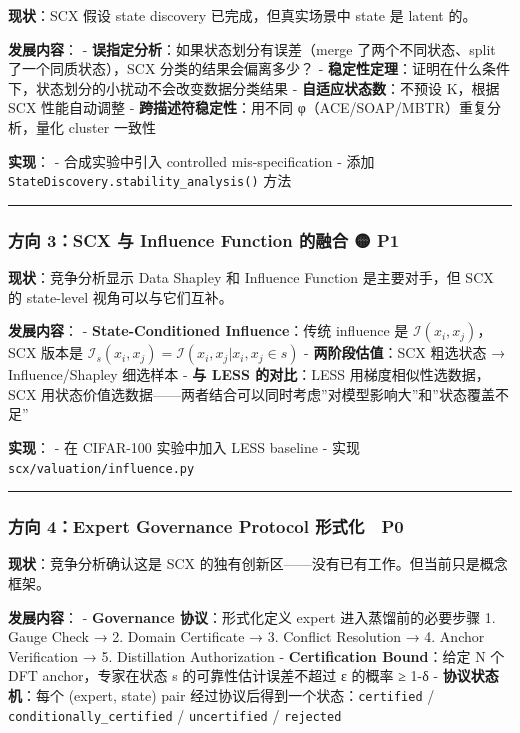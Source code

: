 \documentclass[
  12pt,
]{ctexart}
\begin{document}
\textbf{现状}：SCX 假设 state discovery 已完成，但真实场景中 state 是
latent 的。

\textbf{发展内容}： - \textbf{误指定分析}：如果状态划分有误差（merge
了两个不同状态、split 了一个同质状态），SCX 分类的结果会偏离多少？ -
\textbf{稳定性定理}：证明在什么条件下，状态划分的小扰动不会改变数据分类结果
- \textbf{自适应状态数}：不预设 K，根据 SCX 性能自动调整 -
\textbf{跨描述符稳定性}：用不同 φ（ACE/SOAP/MBTR）重复分析，量化 cluster
一致性

\textbf{实现}： - 合成实验中引入 controlled mis-specification - 添加
\texttt{StateDiscovery.stability\_analysis()} 方法

\begin{center}\rule{0.5\linewidth}{0.5pt}\end{center}

\subsubsection{方向 3：SCX 与 Influence Function 的融合 🟡
P1}\label{ux65b9ux5411-3scx-ux4e0e-influence-function-ux7684ux878dux5408-p1}

\textbf{现状}：竞争分析显示 Data Shapley 和 Influence Function
是主要对手，但 SCX 的 state-level 视角可以与它们互补。

\textbf{发展内容}： - \textbf{State-Conditioned Influence}：传统
influence 是 \(\mathcal{I}(x_i, x_j)\)，SCX 版本是
\(\mathcal{I}_s(x_i, x_j) = \mathcal{I}(x_i, x_j | x_i, x_j \in s)\) -
\textbf{两阶段估值}：SCX 粗选状态 → Influence/Shapley 细选样本 -
\textbf{与 LESS 的对比}：LESS 用梯度相似性选数据，SCX
用状态价值选数据------两者结合可以同时考虑''对模型影响大''和''状态覆盖不足''

\textbf{实现}： - 在 CIFAR-100 实验中加入 LESS baseline - 实现
\texttt{scx/valuation/influence.py}

\begin{center}\rule{0.5\linewidth}{0.5pt}\end{center}

\subsubsection{方向 4：Expert Governance Protocol 形式化 🔴
P0}\label{ux65b9ux5411-4expert-governance-protocol-ux5f62ux5f0fux5316-p0}

\textbf{现状}：竞争分析确认这是 SCX
的独有创新区------没有已有工作。但当前只是概念框架。

\textbf{发展内容}： - \textbf{Governance 协议}：形式化定义 expert
进入蒸馏前的必要步骤 1. Gauge Check → 2. Domain Certificate → 3.
Conflict Resolution → 4. Anchor Verification → 5. Distillation
Authorization - \textbf{Certification Bound}：给定 N 个 DFT
anchor，专家在状态 s 的可靠性估计误差不超过 ε 的概率 ≥ 1-δ -
\textbf{协议状态机}：每个 (expert, state) pair
经过协议后得到一个状态：\texttt{certified} /
\texttt{conditionally\_certified} / \texttt{uncertified} /
\texttt{rejected}
\end{document}
